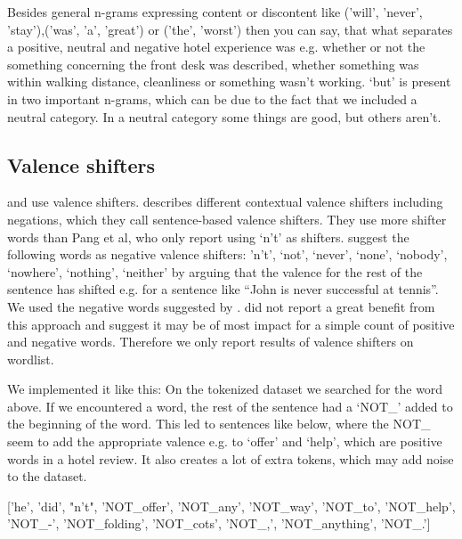 \documentclass{article}
\begin{document}
Besides general n-grams expressing content or discontent like ('will', 'never', 'stay'),('was', 'a', 'great') or ('the', 'worst') then you can say, that what separates a positive, neutral and negative hotel experience was e.g. whether or not the something concerning the front desk was described, whether something was within walking distance, cleanliness or something wasn’t working. ‘but’ is present in two important n-grams, which can be due to the fact that we included a neutral category. In a neutral category some things are good, but others aren’t. 

\subsection{Valence shifters}

\cite{pangetal} and \cite{kennedy} use valence shifters. \cite{polanyi} describes different contextual valence shifters including negations, which they call sentence-based valence shifters. They use more shifter words than Pang et al, who only report using ‘n’t’ as shifters. \cite{polanyi} suggest the following words as negative valence shifters: 'n’t’, ‘not’, ‘never’, ‘none’, ‘nobody’, ‘nowhere’, ‘nothing’, ‘neither’ by arguing that the valence for the rest of the sentence has shifted e.g. for a sentence like “John is never successful at tennis”. We used the negative words suggested by \cite{polanyi}. \cite{pangetal} did not report a great benefit from this approach and \cite{kennedy} suggest it may be of most impact for a simple count of positive and negative words. Therefore we only report results of valence shifters on wordlist. 

We implemented it like this: On the tokenized dataset we searched for the word above. If we encountered a word, the rest of the sentence had a ‘NOT\_’ added to the beginning of the word. This led to sentences like below, where the NOT\_ seem to add the appropriate valence e.g. to ‘offer’ and ‘help’, which are positive words in a hotel review. It also creates a lot of extra tokens, which may add noise to the dataset. 

['he', 'did', "n't", 'NOT\_offer', 'NOT\_any', 'NOT\_way', 'NOT\_to', 'NOT\_help', 'NOT\_-', 'NOT\_folding', 'NOT\_cots', 'NOT\_,', 'NOT\_anything', 'NOT\_.']
\end{document}
